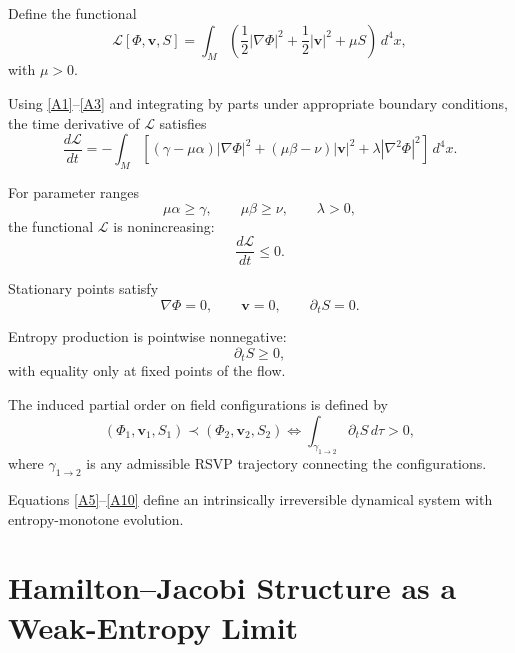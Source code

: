 \documentclass[11pt]{article}
\begin{document}
Define the functional
\begin{equation}
\mathcal{L}[\Phi,\mathbf{v},S]
=
\int_M
\left(
\frac{1}{2}|\nabla\Phi|^2
+
\frac{1}{2}|\mathbf{v}|^2
+
\mu S
\right)
\, d^4x,
\label{A4}
\end{equation}
with $\mu>0$.

Using \eqref{A1}--\eqref{A3} and integrating by parts under appropriate boundary conditions, the time derivative of $\mathcal{L}$ satisfies
\begin{equation}
\frac{d\mathcal{L}}{dt}
=
-\int_M
\left[
(\gamma-\mu\alpha)|\nabla\Phi|^2
+
(\mu\beta-\nu)|\mathbf{v}|^2
+
\lambda|\nabla^2\Phi|^2
\right]
\, d^4x.
\label{A5}
\end{equation}

For parameter ranges
\begin{equation}
\mu\alpha \ge \gamma,
\qquad
\mu\beta \ge \nu,
\qquad
\lambda > 0,
\label{A6}
\end{equation}
the functional $\mathcal{L}$ is nonincreasing:
\begin{equation}
\frac{d\mathcal{L}}{dt} \le 0.
\label{A7}
\end{equation}

Stationary points satisfy
\begin{equation}
\nabla\Phi = 0,
\qquad
\mathbf{v} = 0,
\qquad
\partial_t S = 0.
\label{A8}
\end{equation}

Entropy production is pointwise nonnegative:
\begin{equation}
\partial_t S \ge 0,
\label{A9}
\end{equation}
with equality only at fixed points of the flow.

The induced partial order on field configurations is defined by
\begin{equation}
(\Phi_1,\mathbf{v}_1,S_1)\prec(\Phi_2,\mathbf{v}_2,S_2)
\iff
\int_{\gamma_{1\to2}} \partial_t S\, d\tau > 0,
\label{A10}
\end{equation}
where $\gamma_{1\to2}$ is any admissible RSVP trajectory connecting the configurations.

Equations \eqref{A5}--\eqref{A10} define an intrinsically irreversible dynamical system with entropy-monotone evolution.

\section{Hamilton--Jacobi Structure as a Weak-Entropy Limit}
\end{document}
